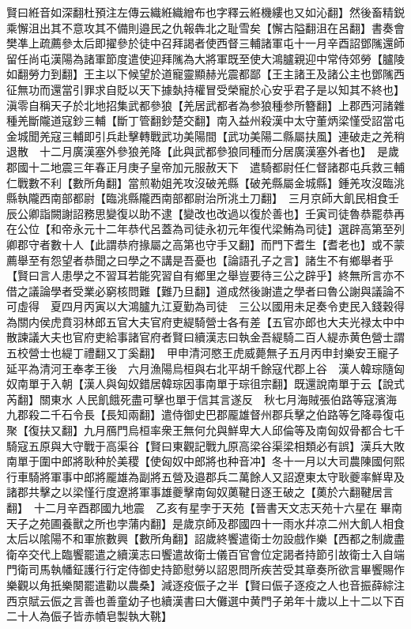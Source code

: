 賢曰絍音如深翻杜預注左傳云織絍織繒布也字釋云絍機縷也又如沁翻】然後畜精鋭乘懈沮出其不意攻其不備則邉民之仇報犇北之耻雪矣【懈古隘翻沮在呂翻】書奏會樊凖上疏薦參太后即擢參於徒中召拜謁者使西督三輔諸軍屯十一月辛酉詔鄧隲還師留任尚屯漢陽為諸軍節度遣使迎拜隲為大將軍既至使大鴻臚親迎中常侍郊勞【臚陵如翻勞力到翻】王主以下候望於道寵靈顯赫光震都鄙【王主諸王及諸公主也鄧隲西征無功而還當引罪求自貶以天下據埶持權冒受榮寵於心安乎君子是以知其不終也】　滇零自稱天子於北地招集武都參狼【羌居武都者為参狼種参所簪翻】上郡西河諸雜種羌斷隴道寇鈔三輔【斷丁管翻鈔楚交翻】南入益州殺漢中太守董炳梁慬受詔當屯金城聞羌寇三輔即引兵赴擊轉戰武功美陽間【武功美陽二縣屬扶風】連破走之羌稍退散　十二月廣漢塞外參狼羌降【此與武都參狼同種而分居廣漢塞外者也】　是歲郡國十二地震三年春正月庚子皇帝加元服赦天下　遣騎都尉任仁督諸郡屯兵救三輔仁戰數不利【數所角翻】當煎勒姐羌攻沒破羌縣【破羌縣屬金城縣】鍾羌攻沒臨洮縣執隴西南部都尉【臨洮縣隴西南部都尉治所洮土刀翻】　三月京師大飢民相食壬辰公卿詣闕謝詔務思變復以助不逮【變改也改過以復於善也】壬寅司徒魯恭罷恭再在公位【和帝永元十二年恭代呂蓋為司徒永初元年復代梁鮪為司徒】選辟高第至列卿郡守者數十人【此謂恭府掾屬之高第也守手又翻】而門下耆生【耆老也】或不蒙薦舉至有怨望者恭聞之曰學之不講是吾憂也【論語孔子之言】諸生不有鄉舉者乎【賢曰言人患學之不習耳若能究習自有鄉里之舉豈要待三公之辟乎】終無所言亦不借之議論學者受業必窮核問難【難乃旦翻】道成然後謝遣之學者曰魯公謝與議論不可虛得　夏四月丙寅以大鴻臚九江夏勤為司徒　三公以國用未足奏令吏民入錢穀得為關内侯虎賁羽林郎五官大夫官府吏緹騎營士各有差【五官亦郎也大夫光禄太中中散諫議大夫也官府吏給事諸官府者賢曰續漢志曰執金吾緹騎二百人緹赤黄色營士謂五校營士也緹丁禮翻又丁奚翻】　甲申清河愍王虎威薨無子五月丙申封樂安王寵子延平為清河王奉孝王後　六月漁陽烏桓與右北平胡千餘寇代郡上谷　漢人韓琮隨匈奴南單于入朝【漢人與匈奴錯居韓琮因事南單于琮徂宗翻】既還說南單于云【說式芮翻】關東水人民飢餓死盡可擊也單于信其言遂反　秋七月海賊張伯路等寇濱海九郡殺二千石令長【長知兩翻】遣侍御史巴郡龎雄督州郡兵擊之伯路等乞降尋復屯聚【復扶又翻】九月鴈門烏桓率衆王無何允與鮮卑大人邱倫等及南匈奴骨都合七千騎寇五原與大守戰于高渠谷【賢曰東觀記戰九原高梁谷渠梁相類必有誤】漢兵大敗　南單于圍中郎將耿种於美稷【使匈奴中郎將也种音冲】冬十一月以大司農陳國何熙行車騎將軍事中郎將龎雄為副將五營及邉郡兵二萬餘人又詔遼東太守耿夔率鮮卑及諸郡共擊之以梁慬行度遼將軍事雄夔擊南匈奴薁鞬日逐王破之【薁於六翻鞬居言翻】　十二月辛酉郡國九地震　乙亥有星孛于天苑【晉書天文志天苑十六星在畢南天子之苑圃養獸之所也孛蒲内翻】是歲京師及郡國四十一雨水幷凉二州大飢人相食　太后以隂陽不和軍旅數興【數所角翻】詔歲終饗遣衛士勿設戲作樂【西都之制歲盡衛卒交代上臨饗罷遣之續漢志曰饗遣故衛士儀百官會位定謁者持節引故衛士入自端門衛司馬執幡鉦護行行定侍御史持節慰勞以詔恩問所疾苦受其章奏所欲言畢饗賜作樂觀以角扺樂闋罷遣勸以農桑】減逐疫侲子之半【賢曰侲子逐疫之人也音振薛綜注西京賦云侲之言善也善童幼子也續漢書曰大儺選中黄門子弟年十歲以上十二以下百二十人為侲子皆赤幘皂製執大鞉】

